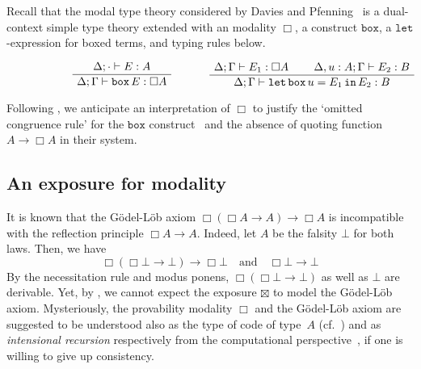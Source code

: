 \documentclass[a4paper,UKenglish,numberwithinsect,cleveref,thm-restate]{lipics-v2021}
\numberwithin{equation}{section}
\theoremstyle{plain}
\begin{document}
\begin{remark}\label{re:S4-modality}
  Recall that the modal type theory considered by Davies and Pfenning~\cite{Davies2001b} is a dual-context simple type theory extended with an \SFour modality $\Box$, a construct $\mathtt{box}$, a $\mathtt{let}$-expression for boxed terms, and typing rules below.
\[
\begin{minipage}{.47\linewidth}
  \begin{prooftree}
    \AxiomC{$\Delta; \cdot \vdash E : A$}
    \UnaryInfC{$\Delta; \Gamma \vdash \mathtt{box}\,E:\Box A$}
  \end{prooftree}
\end{minipage}%
\begin{minipage}{0.47\linewidth}
  \begin{prooftree}
    \AxiomC{$\Delta; \Gamma \vdash E_1 : \Box A$}
    \AxiomC{$\Delta, u : A; \Gamma \vdash E_2 : B$}
  \BinaryInfC{$\Delta; \Gamma \vdash \mathtt{let}\,\mathtt{box}\, u = E_1\, \mathtt{in}\,E_2 : B$}
  \end{prooftree}
\end{minipage}
\]

Following , we anticipate an interpretation of $\Box$ to justify the `omitted congruence rule' for the $\mathtt{box}$ construct~\cite[Section~2.5]{Davies2001b} and the absence of quoting function $A \to \Box A$ in their system.
\end{remark}

\subsection{An exposure for \texorpdfstring{\GL}{GL} modality}
It is known that the Gödel-Löb axiom $\Box(\Box A \to A) \to \Box A$ is incompatible with the reflection principle $\Box A \to A$.
Indeed, let $A$ be the falsity $\bot$ for both laws. Then, we have
\[
  \Box(\Box \bot \to \bot) \to \Box \bot
  \quad\text{and}\quad
  \Box \bot \to \bot
\]
By the necessitation rule and modus ponens, $\Box (\Box \bot \to \bot)$ as well as $\bot$ are derivable.
Yet, by , we cannot expect the exposure $\boxtimes$ to model the Gödel-Löb axiom.
Mysteriously, the provability modality $\Box$ and the Gödel-Löb axiom are suggested to be understood also as the type of code of type~$A$ (cf.~) and as \emph{intensional recursion} respectively from the computational perspective~\cite{Kavvos2017b}, if one is willing to give up consistency.
\end{document}
